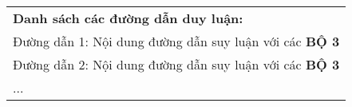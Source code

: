 \begin{table}[ht]
{\begin{tabular}{p{}}
            \textbf{Danh sách các đường dẫn duy luận:}                                                                                                                                                                                                          \\
            \hspace{1cm}Đường dẫn 1: Nội dung đường dẫn suy luận với các \textbf{BỘ 3}                                                                                                                                                                          \\
            \hspace{1cm}Đường dẫn 2: Nội dung đường dẫn suy luận với các \textbf{BỘ 3}                                                                                                                                                                          \\
            \hspace{1cm}...                                                                                                                                                                                                                                     \\
            \bottomrule
        \end{tabular}}
\end{table}



